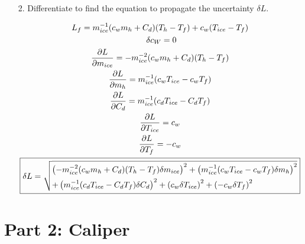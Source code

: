 \documentclass[12pt, letterpaper]{article}
\begin{document}
\begin{enumerate}
        \item[2.] Differentiate to find the equation to propagate the uncertainty $\delta L$.
        
        \begin{mdframed}
            \begin{equation*}
                \begin{gathered}
                    L_{f} = m_{ice}^{-1}(c_{w}m_{h}+C_{d})(T_{h}-T_{f})+c_{w}(T_{ice}-T_{f}) \\\
                    \delta c_{W} = 0    \\
                    \frac{\partial L}{\partial m_{ice}} = -m_{ice}^{-2}(c_{w}m_{h}+C_{d})(T_{h}-T_{f}) \\
                    \frac{\partial L}{\partial m_{h}} = m_{ice}^{-1}(c_{w}T_{ice} - c_{w}T_{f}) \\
                    \frac{\partial L}{\partial C_{d}} = m_{ice}^{-1}(c_{d}T_{ice} - C_{d}T_{f}) \\
                    \frac{\partial L}{\partial T_{ice}} = c_{w} \\
                    \frac{\partial L}{\partial T_{f}} = -c_{w}  \\
                    \boxed{\delta L = \sqrt{ \begin{lgathered}
                        \left(-m_{ice}^{-2}(c_{w}m_{h}+C_{d})(T_{h}-T_{f})\delta m_{ice}\right)^{2} +
                        \left(m_{ice}^{-1}(c_{w}T_{ice} - c_{w}T_{f})\delta m_{h}\right)^{2} \\ +
                        \left(m_{ice}^{-1}(c_{d}T_{ice} - C_{d}T_{f})\delta C_{d}\right)^{2} +
                        \left(c_{w}\delta T_{ice}\right)^{2} +
                        \left(-c_{w}\delta T_{f}\right)^{2}
                    \end{lgathered}}} \\
                \end{gathered}
            \end{equation*}
        \end{mdframed}

    \end{enumerate}

    \section*{Part 2: Caliper}
\end{document}

